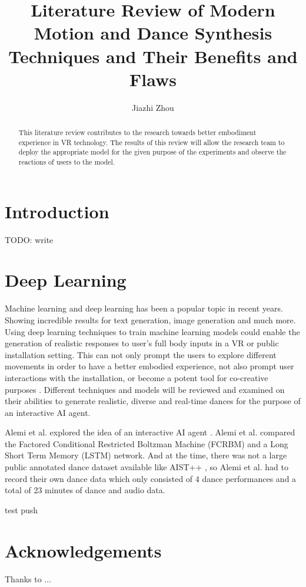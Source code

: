\documentclass[final,5p,times,twocolumn,authoryear]{article}
\begin{document}
\title{Literature Review of Modern Motion and Dance Synthesis Techniques and Their Benefits and Flaws}
\author{Jiazhi Zhou}
\maketitle

\begin{abstract}

This literature review contributes to the research towards better embodiment experience in VR technology. The results of this review will allow the research team to deploy the appropriate model for the given purpose of the experiments and observe the reactions of users to the model.

\end{abstract}

\section{Introduction}

TODO: write

\section{Deep Learning}

Machine learning and deep learning has been a popular topic in recent years. Showing incredible results for text generation, image generation and much more.
Using deep learning techniques to train machine learning models could enable the generation of realistic responses to user's full body inputs in a VR or public installation setting.
This can not only prompt the users to explore different movements in order to have a better embodied experience, not also prompt user interactions with the installation, or become a potent tool for co-creative purposes \cite{Wallace2023}.
Different techniques and models will be reviewed and examined on their abilities to generate realistic, diverse and real-time dances for the purpose of an interactive AI agent.

Alemi et al. explored the idea of an interactive AI agent \cite{Alemi2017}. Alemi et al. compared the Factored Conditional Restricted Boltzman Machine (FCRBM) and a Long Short Term Memory (LSTM) network. And at the time, there was not a large public annotated dance dataset available like AIST++ \cite{Li2021}, so Alemi et al. had to record their own dance data which only consisted of 4 dance performances and a total of 23 minutes of dance and audio data.

test push

\section*{Acknowledgements}
Thanks to ...

 

\end{document}
